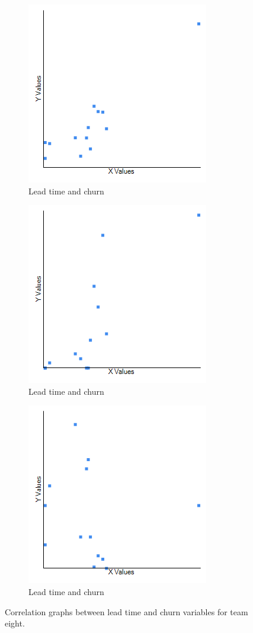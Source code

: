\documentclass[UKenglish]{ifimaster}  %
\begin{document}
\begin{figure}[h] 
  \begin{subfigure}[b]{0.3\textwidth}
  \center
\includegraphics[scale=0.5]{Picture/Eight/LTvsChurn.png}
 \caption{Lead time and churn} 
 \label{fig:a:lt:8}
  \end{subfigure}
  \begin{subfigure}[b]{0.3\textwidth}
    \center
\includegraphics[scale=0.5]{Picture/Eight/LTvsChurnFT.png}
 \caption{Lead time and churn} 
\label{fig:b:lt:8}
  \end{subfigure}
  \begin{subfigure}[b]{0.3\textwidth}
    \center
\includegraphics[scale=0.5]{Picture/Eight/LTvsChurnB.png}
  \caption{Lead time and churn} 
\label{fig:c:lt:8}
  \end{subfigure}
\caption{Correlation graphs between lead time and churn variables for team eight.}
\label{corr:Difference:lt:8}
\end{figure}
\end{document}
